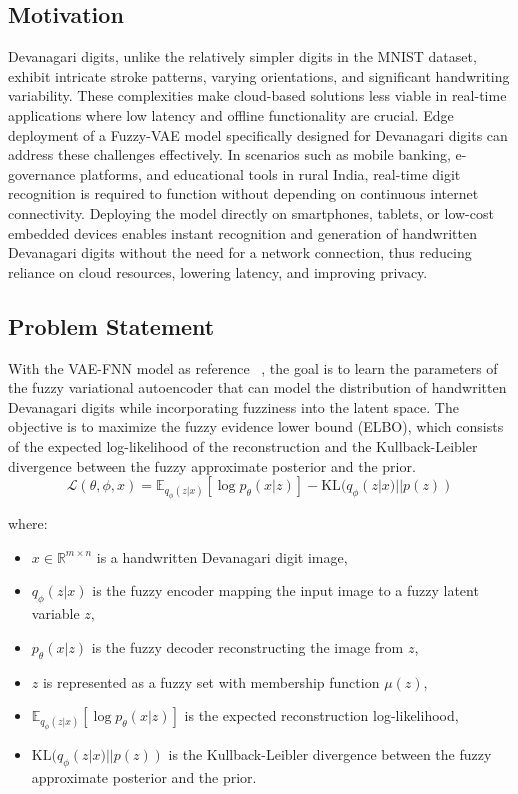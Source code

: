 \documentclass[9pt,a4paper,twoside]{rho-class/rho}
\begin{document}
    \subsection{Motivation}
    Devanagari digits, unlike the relatively simpler digits in the MNIST dataset, exhibit intricate stroke patterns, varying orientations, and significant handwriting variability. These complexities make cloud-based solutions less viable in real-time applications where low latency and offline functionality are crucial.
    Edge deployment of a Fuzzy-VAE model specifically designed for Devanagari digits can address these challenges effectively. In scenarios such as mobile banking, e-governance platforms, and educational tools in rural India, real-time digit recognition is required to function without depending on continuous internet connectivity. Deploying the model directly on smartphones, tablets, or low-cost embedded devices enables instant recognition and generation of handwritten Devanagari digits without the need for a network connection, thus reducing reliance on cloud resources, lowering latency, and improving privacy.
   
    \subsection{Problem Statement}
    With the VAE-FNN model as reference ~\cite{zhang}, the goal is to learn the parameters of the fuzzy variational autoencoder that can model the distribution of handwritten Devanagari digits while incorporating fuzziness into the latent space. The objective is to maximize the fuzzy evidence lower bound (ELBO), which consists of the expected log-likelihood of the reconstruction and the Kullback-Leibler divergence between the fuzzy approximate posterior and the prior. 
    \[ \mathcal{L}(\theta, \phi, x) = \mathbb{E}_{q_{\phi}(z|x)}[\log p_{\theta}(x|z)] - \text{KL}(q_{\phi}(z|x) || p(z)) \]

    where:
    \begin{itemize}
        \item \( x \in \mathbb{R}^{m \times n} \) is a handwritten Devanagari digit image,
        \item \( q_{\phi}(z|x) \) is the fuzzy encoder mapping the input image to a fuzzy latent variable \( z \),
        \item \( p_{\theta}(x|z) \) is the fuzzy decoder reconstructing the image from \( z \),
        \item \( z \) is represented as a fuzzy set with membership function \( \mu(z) \),
        \item \( \mathbb{E}_{q_{\phi}(z|x)}[\log p_{\theta}(x|z)] \) is the expected reconstruction log-likelihood,
        \item \( \text{KL}(q_{\phi}(z|x) || p(z)) \) is the Kullback-Leibler divergence between the fuzzy approximate posterior and the prior.
    \end{itemize}
    
\end{document}
